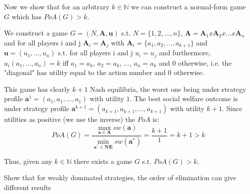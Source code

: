 \documentclass[12pt]{article}
\newcommand{\N}{\mathbb{N}}
\newenvironment{question}[2][Question]{\begin{trivlist}
\item[\hskip \labelsep {\bfseries #1}\hskip \labelsep {\bfseries #2.}]}{\end{trivlist}}
\newenvironment{answer}[2][Answer]{\begin{trivlist}
\item[\hskip \labelsep {\bfseries #1}\hskip \labelsep {\bfseries #2:}]}{\end{trivlist}}
\begin{document}
\begin{answer}{c)}
Now we show that for an arbitrary $k \in \N $ we can construct a normal-form game $G$ which has $PoA(G)>k$.

We construct a game $G=(N,\boldsymbol{A},\boldsymbol{u})$ s.t. $N=\{1,2, ..., n\}$, $\boldsymbol{A}=\boldsymbol{A}_1x\boldsymbol{A}_2x...x\boldsymbol{A}_n$ and for all players i and j $\boldsymbol{A}_i=\boldsymbol{A}_j$ with $\boldsymbol{A}_i=\{a_1, a_2, ..., a_{k+1}\}$ and $\boldsymbol{u}=(u_1, ..., u_n)$ s.t. for all players i and j $u_i=u_j$ and furthermore, $u_i(a_1, ..., a_n)=k$ iff $a_1=a_k$, $a_2=a_k$, ..., $a_n=a_k$ and 0 otherwise, i.e. the "diagonal" has utility equal to the action number and $0$ otherwise.

This game has clearly $k+1$ Nash equilibria, the worst one being under strategy profile $\boldsymbol{a}^1=(a_1, a_1, ..., a_1)$ with utility $1$. The best social welfare outcome is under strategy profile $\boldsymbol{a}^{k+1}=(a_{k+1}, a_{k+1}, ..., a_{k+1})$ with utility $k+1$. Since utilities as positive (we use the inverse) the $PoA$ is: \\

$$PoA(G)=\frac{\max_{\boldsymbol{a} \in \boldsymbol{A}}sw(\boldsymbol{a})}{\min_{\boldsymbol{a}^* \in \boldsymbol{NE} }sw(\boldsymbol{a}^*)}=\frac{k+1}{1}=k+1>k$$

Thus, given any $k \in \N$ there exists a game $G$ s.t. $PoA(G)>k$.
\end{answer}
\begin{question}{2}
Show that for weakly dominated strategies, the order of elimination can give different results
\end{question}
\end{document}
